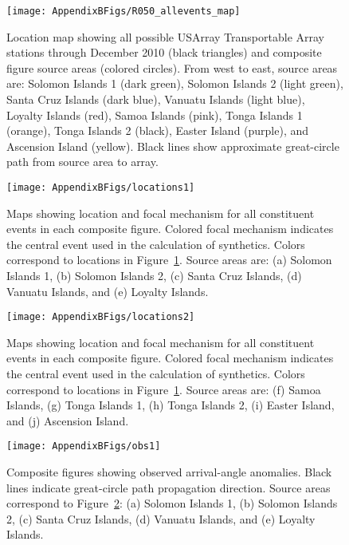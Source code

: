 \documentclass[12pt,oneside]{book}
\begin{document}
\begin{figure} 
\begin{center}
\texttt{[image: AppendixBFigs/R050\_allevents\_map]} 
\caption[Source area locations for composite figures]{Location map showing all possible USArray Transportable Array stations through December 2010 (black triangles) and composite figure source areas (colored circles). From west to east, source areas are: Solomon Islands 1 (dark green), Solomon Islands 2 (light green), Santa Cruz Islands (dark blue), Vanuatu Islands (light blue), Loyalty Islands (red), Samoa Islands (pink), Tonga Islands 1 (orange), Tonga Islands 2 (black), Easter Island (purple), and Ascension Island (yellow). Black lines show approximate great-circle path from source area to array. }
\label{figB:largemap}
\end{center}
\end{figure}
%
\begin{figure} 
\begin{center}
\texttt{[image: AppendixBFigs/locations1]} 
\caption[Constituent event locations and focal mechanisms for composite figures]{Maps showing location and focal mechanism for all constituent events in each composite figure. Colored focal mechanism indicates the central event used in the calculation of synthetics. Colors correspond to locations in Figure~\ref{figB:largemap}. Source areas are: (a) Solomon Islands 1, (b) Solomon Islands 2, (c) Santa Cruz Islands, (d) Vanuatu Islands, and (e) Loyalty Islands. }
\label{figB:zoommap1}
\end{center}
\end{figure}
%
\begin{figure} 
\begin{center}
\texttt{[image: AppendixBFigs/locations2]} 
\caption[Constituent event locations and focal mechanisms for composite figures, continued]{Maps showing location and focal mechanism for all constituent events in each composite figure. Colored focal mechanism indicates the central event used in the calculation of synthetics. Colors correspond to locations in Figure~\ref{figB:largemap}. Source areas are: (f) Samoa Islands, (g) Tonga Islands 1, (h) Tonga Islands 2, (i) Easter Island, and (j) Ascension Island. }
\label{figB:zoommap2}
\end{center}
\end{figure}
%
\begin{figure} 
\begin{center}
\texttt{[image: AppendixBFigs/obs1]} 
\caption[Composite arrival-angle anomaly observations]{Composite figures showing observed arrival-angle anomalies. Black lines indicate great-circle path propagation direction. Source areas correspond to Figure~\ref{figB:zoommap1}: (a) Solomon Islands 1, (b) Solomon Islands 2, (c) Santa Cruz Islands, (d) Vanuatu Islands, and (e) Loyalty Islands. }
\label{figB:obs1}
\end{center}
\end{figure}
\end{document}
